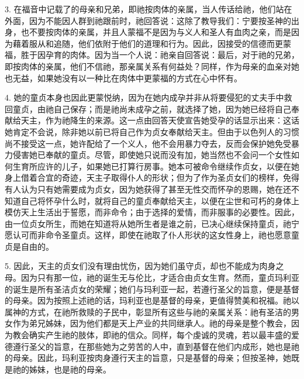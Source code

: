 3. 在福音中记载了的母亲和兄弟，即祂按肉体的亲属，当人传话给祂，他们站在外面，因为不能因人群到祂跟前时，祂回答说：这除了教导我们：宁要按圣神的出身，也不要按肉体的亲属，并且人蒙福不是因为与义人和圣人有血肉之亲，而是因为藉着服从和追随，他们依附于他们的道理和行为。因此，因接受的信德而更蒙福，胜于因孕育的肉体。因为当一个人说：祂亲自回答说：最后，对于祂的兄弟，即按肉体的亲属，他们不信祂，那亲属关系有何益处？同样，作为母亲的血亲对她也无益，如果她没有以一种比在肉体中更蒙福的方式在心中怀有。\par

4. 她的童贞本身也因此更蒙悦纳，因为在她内成孕并非从将要侵犯的丈夫手中救回童贞，由祂自己保存；而是祂尚未成孕之前，就选择了她，因为她已经将自己奉献给天主，作为祂降生的来源。这一点由回答天使宣告她受孕的话显示出来：这话她肯定不会说，除非她以前已将自己作为贞女奉献给天主。但由于以色列人的习惯尚不接受这一点，她许配给了一个义人，他不会用暴力夺去，反而会保护她免受暴力侵害她已奉献的童贞。尽管，即使她只说而没有加，她当然也不会问一个女性如何生育所应许的儿子，如果她已打算行房事。她本可被命令继续作贞女，以便在她身上借着合宜的奇迹，天主子取得仆人的形状；但为了作为圣贞女们的榜样，免得有人认为只有她需要成为贞女，因为她获得了甚至无性交而怀孕的恩赐，她在还不知道自己将怀孕什么时，就将自己的童贞奉献给天主，以便在尘世和可朽的身体上模仿天上生活出于誓愿，而非命令；由于选择的爱情，而非服事的必要性。因此，由一位贞女所生，而她在知道将从她所生者是谁之前，已决心继续保持童贞，祂宁愿认可而非命令圣童贞。这样，即使在祂取了仆人形状的这女性身上，祂也愿意童贞是自由的。\par

5. 因此，天主的贞女们没有理由忧伤，因为她们虽守贞，却也不能成为肉身之母。因为只有那一位，祂的诞生无与伦比，才适合由贞女生育。然而，童贞玛利亚的诞生是所有圣洁贞女的荣耀；她们与玛利亚一起，若遵行圣父的旨意，便是基督的母亲。因为按照上述祂的话，玛利亚也是基督的母亲，更值得赞美和祝福。祂以属神的方式，在祂所救赎的子民中，彰显所有这些与祂的亲属关系：祂有圣洁的男女作为弟兄姊妹，因为他们都是天上产业的共同继承人。祂的母亲是整个教会，因为教会确实产生祂的肢体，即祂的信众。同样，每个虔诚的灵魂，若以最丰盛的爱德遵行圣父的旨意，在那些她为之劳苦的人中，直到基督在他们内成形，她也是祂的母亲。因此，玛利亚按肉身遵行天主的旨意，只是基督的母亲；但按圣神，她既是祂的姊妹，也是祂的母亲。\par

